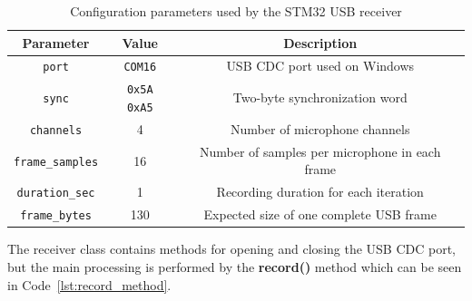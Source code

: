     \begin{table}[h]
\centering
\caption{Configuration parameters used by the STM32 USB receiver}
\label{tab:receiver_config}
\begin{tabular}{|c|c|c|}
\hline
\textbf{Parameter} & \textbf{Value} & \textbf{Description} \\
\hline
\texttt{port} & \texttt{COM16} & USB CDC port used on Windows \\
\hline
\texttt{sync} & \texttt{0x5A 0xA5} & Two-byte synchronization word \\
\hline
\texttt{channels} & 4 & Number of microphone channels \\
\hline
\texttt{frame\_samples} & 16 & Number of samples per microphone in each frame \\
\hline
\texttt{duration\_sec} & 1 & Recording duration for each iteration \\
\hline
\texttt{frame\_bytes} & 130 & Expected size of one complete USB frame \\
\hline
\end{tabular}
\end{table}
    The receiver class contains methods for opening and closing the USB CDC port, but the main processing is performed by the \textbf{record()} method which can be seen in Code~\ref{lst:record_method}. 
    \newpage
